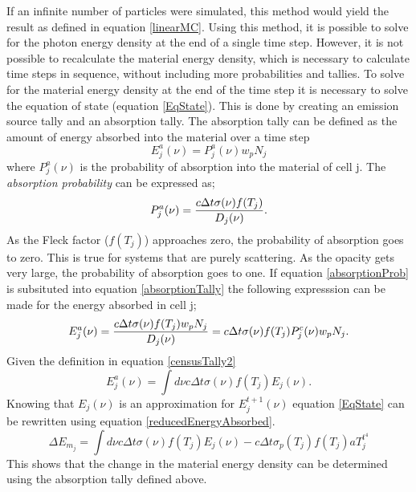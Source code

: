 	If an infinite number of particles were simulated, this method would yield the result as defined in equation \ref{linearMC}. Using this method, it is possible to solve for the photon energy density at the end of a single time step. However, it is not possible to recalculate the material energy density, which is necessary to calculate time steps in sequence, without including more probabilities and tallies. To solve for the material energy density at the end of the time step it is necessary to solve the equation of state (equation \ref{EqState}). This is done by creating an emission source tally and an absorption tally. The absorption tally can be defined as the amount of energy absorbed into the material over a time step
	\begin{equation}
	\label{absorptionTally}
	E^a_j(\nu)=P^a_j(\nu)w_pN_j
	\end{equation}
	where $P^a_j(\nu)$ is the probability of absorption into the material of cell j. The {\it absorption probability} can be expressed as;
	\begin{equation}
	\label{absorptionProb}
	P^a_j(\nu)={c\Delta{t}\sigma(\nu){f(T_j)}\over{D_j(\nu)}}.
	\end{equation}
	As the Fleck factor ($f(T_j)$) approaches zero, the probability of absorption goes to zero. This is true for systems that are purely scattering. As the opacity gets very large, the probability of absorption goes to one. If equation \ref{absorptionProb} is subsituted into equation \ref{absorptionTally} the following expresssion can be made for the energy absorbed in cell j;
	\begin{equation}
	\label{energyAbsorbed}
	E^a_j(\nu)={c\Delta{t}\sigma(\nu){f(T_j)}w_pN_j\over{D_j(\nu)}}=c\Delta{t}\sigma(\nu){f(T_j)}P^c_j(\nu)w_pN_j.
	\end{equation}
	Given the definition in equation \ref{censusTally2}
	\begin{equation}
	\label{reducedEnergyAbsorbed}
	E^a_j(\nu)=\int{d\nu}c\Delta{t}\sigma(\nu){f(T_j)}E_j(\nu).
	\end{equation}
	Knowing that $E_j(\nu)$ is an approximation for $E^{t+1}_j(\nu)$ equation \ref{EqState} can be rewritten using equation \ref{reducedEnergyAbsorbed}.
	\begin{equation}
	\label{EqState}
	\Delta{E_{m_j}}=\int{d\nu}c\Delta{t}\sigma(\nu){f(T_j)}E_j(\nu)-c\Delta{t}\sigma_p(T_j) f(T_j){aT^{t^4}_j}
	\end{equation}
	This shows that the change in the material energy density can be determined using the absorption tally defined above.

